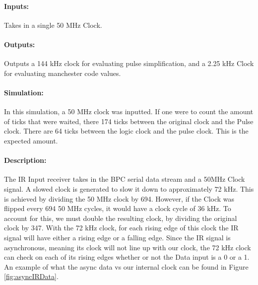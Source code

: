 \documentclass[]{article}
\begin{document}
\paragraph{Inputs:} Takes in a single 50 MHz Clock.
\paragraph{Outputs:} Outputs a 144 kHz clock for evaluating pulse simplification, and a 2.25 kHz Clock for evaluating manchester code values.
\paragraph{Simulation:} In this simulation, a 50 MHz clock was inputted. If one were to count the amount of ticks that were waited,
there 174 ticks between the original clock and the Pulse clock. There are 64 ticks between the logic clock and the pulse clock. This is the expected amount. 
\paragraph{Description:} The IR Input receiver takes in the BPC serial data stream and a 50MHz Clock signal. A slowed clock is generated to slow it down to approximately 72 kHz.
This is achieved by dividing the 50 MHz clock by 694. However, if the Clock was flipped every 694 50 MHz cycles, it would have a clock cycle of 36 kHz. 
To account for this, we must double the resulting clock, by dividing the original clock by 347.
With the 72 kHz clock, for each rising edge of this clock the IR signal will have either a rising edge or a falling edge. 
Since the IR signal is asynchronous, meaning its clock will not line up with our clock, the 72 kHz clock can check on each of its rising edges whether or not the Data input is a 0 or a 1.
An example of what the async data vs our internal clock can be found in Figure \ref{fig:asyncIRData}.
\end{document}
